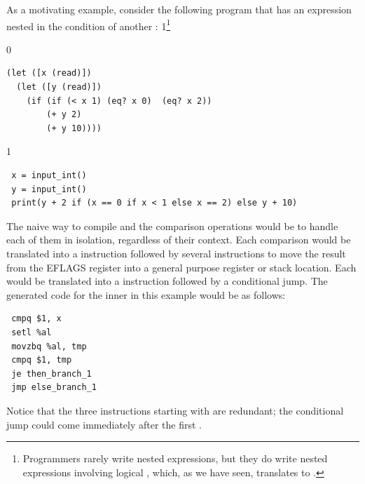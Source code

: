 \documentclass[7x10]{TimesAPriori_MIT}%
\def\racketEd{0}
\def\pythonEd{1}
\def\edition{1}
\newcommand{\pythonColor}[0]{}
\newcommand{\python}[1]{{\if\edition\pythonEd\pythonColor #1\fi}}
\numberwithin{theorem}{chapter}
\numberwithin{definition}{chapter}
\numberwithin{equation}{chapter}
\begin{document}
As a motivating example, consider the following program that has an
 expression nested in the condition of another :%
\python{\footnote{Programmers rarely write nested 
    expressions, but they do write nested expressions involving
    logical \code{and}, which, as we have seen, translates to
    \code{if}.}}
\begin{center}
\begin{minipage}{0.96\textwidth}
{\if\edition\racketEd        
\begin{lstlisting}
(let ([x (read)])
  (let ([y (read)])
    (if (if (< x 1) (eq? x 0)  (eq? x 2))
        (+ y 2)
        (+ y 10))))
\end{lstlisting}
\fi}
{\if\edition\pythonEd\pythonColor
\begin{lstlisting}
 x = input_int()
 y = input_int()
 print(y + 2 if (x == 0 if x < 1 else x == 2) else y + 10)
\end{lstlisting}
\fi}
\end{minipage}
\end{center}
%
The naive way to compile  and the comparison operations would
be to handle each of them in isolation, regardless of their context.
Each comparison would be translated into a  instruction
followed by several instructions to move the result from the EFLAGS
register into a general purpose register or stack location. Each
 would be translated into a  instruction followed by
a conditional jump. The generated code for the inner  in this
example would be as follows:
\begin{center}
\begin{minipage}{0.96\textwidth}
\begin{lstlisting}
 cmpq $1, x
 setl %al
 movzbq %al, tmp
 cmpq $1, tmp
 je then_branch_1
 jmp else_branch_1
\end{lstlisting}
\end{minipage}
\end{center}
Notice that the three instructions starting with  are
redundant; the conditional jump could come immediately after the first
. 
\end{document}

